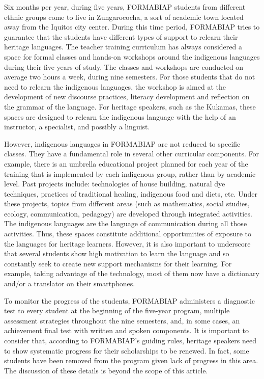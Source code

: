 \documentclass[output=paper]{langscibook}
\begin{document}
Six months per year, during five years, FORMABIAP students from different ethnic groups come to live in Zungarococha, a sort of academic town located away from the Iquitos city center. During this time period, FORMABIAP tries to guarantee that the students have different types of support to relearn their heritage languages. The teacher training curriculum has always considered a space for formal classes and hands-on workshops around the indigenous languages during their five years of study. The classes and workshops are conducted on average two hours a week, during nine semesters. For those students that do not need to relearn the indigenous languages, the workshop is aimed at the development of new discourse practices, literacy development and reflection on the grammar of the language. For heritage speakers, such as the Kukamas, these spaces are designed to relearn the indigenous language with the help of an instructor, a specialist, and possibly a linguist.

However, indigenous languages in FORMABIAP are not reduced to specific classes. They have a fundamental role in several other curricular components. For example, there is an umbrella educational project planned for each year of the training that is implemented by each indigenous group, rather than by academic level. Past projects include: technologies of house building, natural dye techniques, practices of traditional healing, indigenous food and diets, etc. Under these projects, topics from different areas (such as mathematics, social studies, ecology, communication, pedagogy) are developed through integrated activities. The indigenous languages are the language of communication during all those activities. Thus, these spaces constitute additional opportunities of exposure to the languages for heritage learners. However, it is also important to underscore that several students show high motivation to learn the language and so constantly seek to create new support mechanisms for their learning. For example, taking advantage of the technology, most of them now have a dictionary and/or a translator on their smartphones.

To monitor the progress of the students, FORMABIAP administers a diagnostic test to every student at the beginning of the five-year program, multiple assessment strategies throughout the nine semesters, and, in some cases, an achievement final test with written and spoken components. It is important to consider that, according to FORMABIAP’s guiding rules, heritage speakers need to show systematic progress for their scholarships to be renewed. In fact, some students have been removed from the program given lack of progress in this area. The discussion of these details is beyond the scope of this article.
\end{document}
